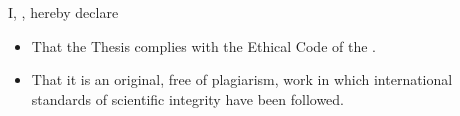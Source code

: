 \documentclass[../main]{subfiles}
\begin{document}
\cleartooddpage[\thispagestyle{empty}]
\thispagestyle{empty}
\vspace*{\fill}
\begin{center}
I, \thesisAuthor, hereby declare
\begin{itemize}
    \item That the Thesis complies with the Ethical Code of the \thesisUniversity.
    \item That it is an original, free of plagiarism, work in which international standards of scientific integrity have been followed.
\end{itemize}

\vspace{0.5cm}

\end{center}
\vspace*{\fill}
\end{document}
